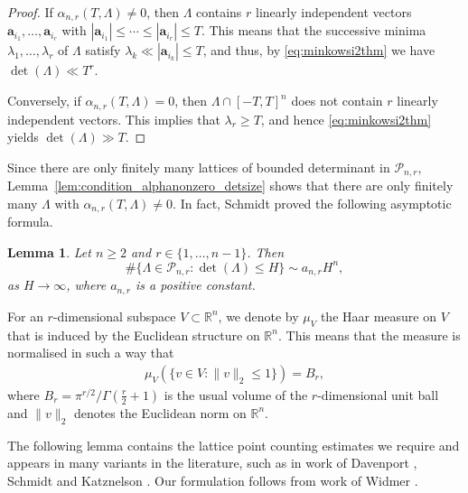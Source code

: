 \documentclass[11pt,reqno]{amsart}
\newtheorem{lem}[thm]{Lemma}
\theoremstyle{definition}
\theoremstyle{remark}
\numberwithin{equation}{section}
\numberwithin{thm}{section}
\numberwithin{table}{section}
\def \R {{\mathbb R}}
\def\a{\mathbf{a}}
\begin{document}
    \begin{proof}
       If $\alpha_{n,r}(T, \Lambda) \neq 0$, then $\Lambda$ contains $r$ linearly independent vectors $\a_{i_1}, \ldots, \a_{i_r}$ with $|\a_{i_1}|\le \cdots \le |\a_{i_r}|\le T$. This means that the successive minima $\lambda_1, \ldots, \lambda_r$ of $\Lambda$  satisfy $\lambda_k \ll |\a_{i_k}| \le T$, and thus, by \eqref{eq:minkowsi2thm} we have 
    $
    \det (\Lambda) \ll T^r. 
    $
    
    Conversely, if $\alpha_{n,r}(T,\Lambda) = 0$, then $\Lambda \cap [-T,T]^n$ does not contain $r$ linearly independent vectors.
    This implies that $\lambda_r \ge T$,
    and hence \eqref{eq:minkowsi2thm} yields $\det(\Lambda) \gg T$. 
    \end{proof}

    
    Since there are only finitely many lattices of bounded determinant in $\mathcal{P}_{n,r}$, Lemma~\ref{lem:condition_alphanonzero_detsize} shows that there are only finitely many $\Lambda$ with 
    $\alpha_{n,r}(T, \Lambda) \neq 0$. In fact, Schmidt \cite[Theorem~1]{Schm} proved the following asymptotic formula. 
    \begin{lem}
    \label{lem:nooflatticesofboundedheight}
        Let $n \ge 2$ and $ r \in \{ 1, \ldots, n-1 \}$. Then
        \[
        \# \{ \Lambda \in \mathcal{P}_{n,r}: \det(\Lambda) \le H \}
        \sim a_{n,r} H^n,
        \]
 as $H \to \infty$, 
        where $a_{n,r}$ is a positive constant.
    \end{lem}

    For an $r$-dimensional subspace $V \subset \R^n$,
    we denote by $\mu_V$
    the Haar measure on $V$ that is induced by the Euclidean structure on $\R^n$. This means that the measure is normalised in such a way that 
    \begin{align}\label{eq:unitballvolume}
         \mu_V(\{v \in V: \|v \|_2 \le 1 \}) = B_r,
    \end{align}
    where $B_r = \pi^{r/2}/\Gamma(\tfrac{r}{2}+1)$ is the usual volume of the $r$-dimensional unit ball and $\|v\|_2$ denotes the Euclidean norm on $\R^n$.

 The following lemma contains the lattice point counting estimates we require and appears in many variants in the literature, such as in work of Davenport \cite{davenport_on_a_principle},  Schmidt \cite[Lemma~2]{Schm} and   Katznelson  \cite[Lemma~2]{katznelson}. Our formulation follows from work of Widmer \cite[Theorem~5.4]{widmer}. 
 
\end{document}
